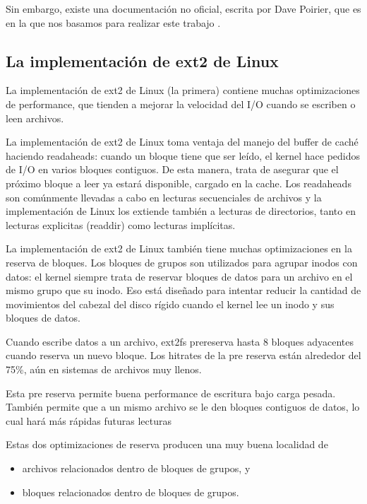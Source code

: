 Sin embargo, existe una documentación no oficial, escrita por Dave Poirier, que es en la que nos basamos para realizar este trabajo \cite{ext2doc}.

\subsection{La implementación de ext2 de Linux}

La implementación de ext2 de Linux (la primera) contiene muchas optimizaciones de performance, que tienden a mejorar la velocidad del I/O cuando se escriben o leen archivos.

La implementación de ext2 de Linux toma ventaja del manejo del buffer de caché haciendo readaheads: cuando un bloque tiene que ser leído, el kernel hace pedidos de I/O en varios bloques contiguos. De esta manera, trata de asegurar que el próximo bloque a leer ya estará disponible, cargado en la cache. Los readaheads son comúnmente llevadas a cabo en lecturas secuenciales de archivos y la implementación de Linux los extiende también a lecturas de directorios, tanto en lecturas explicitas (readdir) como lecturas implícitas.

La implementación de ext2 de Linux también tiene muchas optimizaciones en la reserva de bloques. Los bloques de grupos son utilizados para agrupar inodos con datos: el kernel siempre trata de reservar bloques de datos para un archivo en el mismo grupo que su inodo. Eso está diseñado para intentar reducir la cantidad de movimientos del cabezal del disco rígido cuando el kernel lee un inodo y sus bloques de datos.

Cuando escribe datos a un archivo, ext2fs prereserva hasta 8 bloques adyacentes cuando reserva un nuevo bloque. Los hitrates de la pre reserva están alrededor del 75\%, aún en sistemas de archivos muy llenos.

Esta pre reserva permite buena performance de escritura bajo carga pesada. También permite que a un mismo archivo se le den bloques contiguos de datos, lo cual hará más rápidas futuras lecturas

Estas dos optimizaciones de reserva producen una muy buena localidad de
\begin{itemize}
 \item archivos relacionados dentro de bloques de grupos, y
 \item bloques relacionados dentro de bloques de grupos.
\end{itemize}




